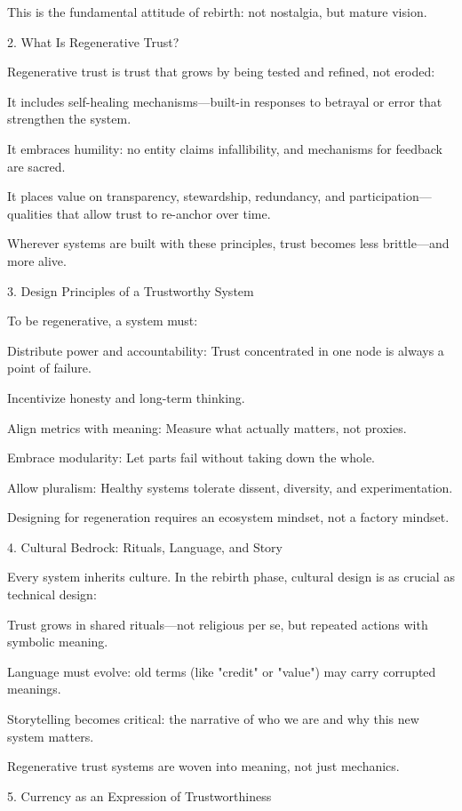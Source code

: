 \documentclass[11pt,oneside]{book}
\begin{document}
This is the fundamental attitude of rebirth: not nostalgia, but mature vision.

2. What Is Regenerative Trust?


Regenerative trust is trust that grows by being tested and refined, not eroded:

    It includes self-healing mechanisms—built-in responses to betrayal or error that strengthen the system.

    It embraces humility: no entity claims infallibility, and mechanisms for feedback are sacred.

    It places value on transparency, stewardship, redundancy, and participation—qualities that allow trust to re-anchor over time.

Wherever systems are built with these principles, trust becomes less brittle—and more alive.

3. Design Principles of a Trustworthy System


To be regenerative, a system must:

    Distribute power and accountability: Trust concentrated in one node is always a point of failure.

    Incentivize honesty and long-term thinking.

    Align metrics with meaning: Measure what actually matters, not proxies.

    Embrace modularity: Let parts fail without taking down the whole.

    Allow pluralism: Healthy systems tolerate dissent, diversity, and experimentation.

Designing for regeneration requires an ecosystem mindset, not a factory mindset.

4. Cultural Bedrock: Rituals, Language, and Story


Every system inherits culture. In the rebirth phase, cultural design is as crucial as technical design:

    Trust grows in shared rituals—not religious per se, but repeated actions with symbolic meaning.

    Language must evolve: old terms (like "credit" or "value") may carry corrupted meanings.

    Storytelling becomes critical: the narrative of who we are and why this new system matters.

Regenerative trust systems are woven into meaning, not just mechanics.

5. Currency as an Expression of Trustworthiness
\end{document}
